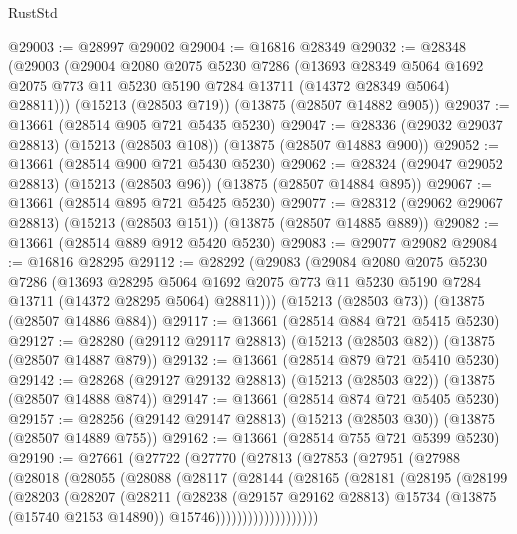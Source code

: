\begin{lexlean}{RustStd}
\begin{coremodule}
@29003 := @28997 @29002
@29004 := @16816 @28349
@29032 := @28348
    (@29003
      (@29004
        @2080
        @2075
        @5230
        @7286
        (@13693
          @28349
          @5064
          @1692
          @2075
          @773
          @11
          @5230
          @5190
          @7284
          @13711
          (@14372 @28349 @5064)
          @28811)))
    (@15213 (@28503 @719))
    (@13875 (@28507 @14882 @905))
@29037 := @13661 (@28514 @905 @721 @5435 @5230)
@29047 := @28336 (@29032 @29037 @28813) (@15213 (@28503 @108)) (@13875 (@28507 @14883 @900))
@29052 := @13661 (@28514 @900 @721 @5430 @5230)
@29062 := @28324 (@29047 @29052 @28813) (@15213 (@28503 @96)) (@13875 (@28507 @14884 @895))
@29067 := @13661 (@28514 @895 @721 @5425 @5230)
@29077 := @28312 (@29062 @29067 @28813) (@15213 (@28503 @151)) (@13875 (@28507 @14885 @889))
@29082 := @13661 (@28514 @889 @912 @5420 @5230)
@29083 := @29077 @29082
@29084 := @16816 @28295
@29112 := @28292
    (@29083
      (@29084
        @2080
        @2075
        @5230
        @7286
        (@13693
          @28295
          @5064
          @1692
          @2075
          @773
          @11
          @5230
          @5190
          @7284
          @13711
          (@14372 @28295 @5064)
          @28811)))
    (@15213 (@28503 @73))
    (@13875 (@28507 @14886 @884))
@29117 := @13661 (@28514 @884 @721 @5415 @5230)
@29127 := @28280 (@29112 @29117 @28813) (@15213 (@28503 @82)) (@13875 (@28507 @14887 @879))
@29132 := @13661 (@28514 @879 @721 @5410 @5230)
@29142 := @28268 (@29127 @29132 @28813) (@15213 (@28503 @22)) (@13875 (@28507 @14888 @874))
@29147 := @13661 (@28514 @874 @721 @5405 @5230)
@29157 := @28256 (@29142 @29147 @28813) (@15213 (@28503 @30)) (@13875 (@28507 @14889 @755))
@29162 := @13661 (@28514 @755 @721 @5399 @5230)
@29190 := @27661
    (@27722
      (@27770
        (@27813
          (@27853
            (@27951
              (@27988
                (@28018
                  (@28055
                    (@28088
                      (@28117
                        (@28144
                          (@28165
                            (@28181
                              (@28195
                                (@28199
                                  (@28203
                                    (@28207
                                      (@28211
                                        (@28238
                                          (@29157 @29162 @28813)
                                          @15734
                                          (@13875 (@15740 @2153 @14890))
                                          @15746)))))))))))))))))))

\end{coremodule}
\end{lexlean}
